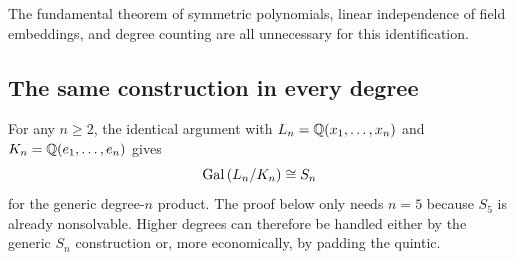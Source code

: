The fundamental theorem of symmetric polynomials, linear independence of
field embeddings, and degree counting are all unnecessary for this
identification.

\subsection{The same construction in every degree}

For any $n\ge2$, the identical argument with
$L_n=\mathbb Q(x_1,\ldots,x_n)$ and
$K_n=\mathbb Q(e_1,\ldots,e_n)$ gives
\[
 \operatorname{Gal}\left(L_n/K_n\right)\cong S_n
\]
for the generic degree-$n$ product.  The proof below only needs $n=5$ because
$S_5$ is already nonsolvable.  Higher degrees can therefore be handled either
by the generic $S_n$ construction or, more economically, by padding the
quintic.
